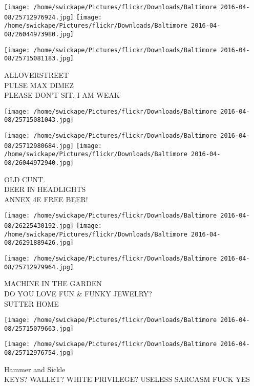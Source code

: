 \documentclass[10pt,letterpaper]{article}
\begin{document}
\texttt{[image: /home/swickape/Pictures/flickr/Downloads/Baltimore 2016-04-08/25712976924.jpg]}
\texttt{[image: /home/swickape/Pictures/flickr/Downloads/Baltimore 2016-04-08/26044973980.jpg]}

\vspace{0.25in}
\texttt{[image: /home/swickape/Pictures/flickr/Downloads/Baltimore 2016-04-08/25715081183.jpg]}

ALLOVERSTREET\\
PULSE MAX DIMEZ\\
PLEASE DON'T SIT, I AM WEAK\\
\pagebreak

\texttt{[image: /home/swickape/Pictures/flickr/Downloads/Baltimore 2016-04-08/25715081043.jpg]}

\vspace{0.25in}
\texttt{[image: /home/swickape/Pictures/flickr/Downloads/Baltimore 2016-04-08/25712980684.jpg]}
\texttt{[image: /home/swickape/Pictures/flickr/Downloads/Baltimore 2016-04-08/26044972940.jpg]}

OLD CUNT.\\
DEER IN HEADLIGHTS\\
ANNEX 4E FREE BEER!\\
\pagebreak

\texttt{[image: /home/swickape/Pictures/flickr/Downloads/Baltimore 2016-04-08/26225430192.jpg]}
\texttt{[image: /home/swickape/Pictures/flickr/Downloads/Baltimore 2016-04-08/26291889426.jpg]}

\texttt{[image: /home/swickape/Pictures/flickr/Downloads/Baltimore 2016-04-08/25712979964.jpg]}

MACHINE IN THE GARDEN\\
DO YOU LOVE FUN \& FUNKY JEWELRY?\\
SUTTER HOME\\
\pagebreak

\texttt{[image: /home/swickape/Pictures/flickr/Downloads/Baltimore 2016-04-08/25715079663.jpg]}

\vspace{0.25in}
\texttt{[image: /home/swickape/Pictures/flickr/Downloads/Baltimore 2016-04-08/25712976754.jpg]}

Hammer and Sickle\\
KEYS?  WALLET?  WHITE PRIVILEGE?  USELESS SARCASM FUCK YES\\
\pagebreak
\end{document}
